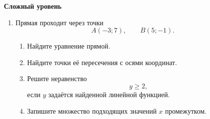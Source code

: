 \documentclass[a4paper,12pt]{article}
\newcommand{\subtopic}[1]{%
  \vspace{0.5em}
  {\large\bfseries\color{darkaccent}#1\par}
  \vspace{0.2em}
}
\begin{document}
\subtopic{Сложный уровень}

\begin{enumerate}[resume]

\item Прямая проходит через точки
\[
A(-3;7),
\qquad
B(5;-1).
\]

\begin{enumerate}[label=\arabic*)]
\item Найдите уравнение прямой.
\item Найдите точки её пересечения с осями координат.
\item Решите неравенство
\[
y\ge2,
\]
если \(y\) задаётся найденной линейной функцией.
\item Запишите множество подходящих значений \(x\) промежутком.
\end{enumerate}

\end{enumerate}
\end{document}
